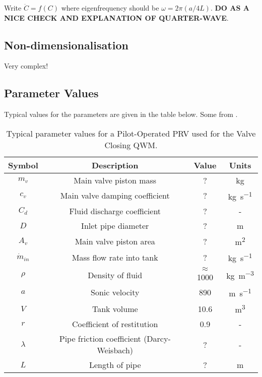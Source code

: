 Write $\ddot{C} = f(C)$ where eigenfrequency should be $\omega = 2\pi\left( a / 4L \right)$. \textbf{DO AS A NICE CHECK AND EXPLANATION OF QUARTER-WAVE}.

\subsection{Non-dimensionalisation}

Very complex!

\subsection{Parameter Values}

Typical values for the parameters are given in the table below. Some from \cite{Hos2016DynamicService}.

\begin{table}[ht]
    \centering
    \begin{tabular}{c|c|c|c}
        Symbol & Description & Value & Units \\ \hline \hline
        $m_v$ & Main valve piston mass & ? & \si{kg} \\ \hline %
        $c_v$ & Main valve damping coefficient & ? & \si{kg.s^{-1}} \\ \hline %
        $C_d$ & Fluid discharge coefficient & ? & - \\ \hline %
        $D$ & Inlet pipe diameter & ? & \si{m} \\ \hline %
        $A_v$ & Main valve piston area & ? & \si{m^2} \\ \hline
        $\dot{m}_{in}$ & Mass flow rate into tank & ? & \si{kg.s^{-1}} \\ \hline %
        $\rho$ & Density of fluid & $\approx$1000 & \si{kg.m^{-3}} \\ \hline %
        $a$ & Sonic velocity & 890 & \si{m.s^{-1}} \\ \hline %
        $V$ & Tank volume & 10.6 & \si{m^3} \\ \hline %
        $r$ & Coefficient of restitution & 0.9 & - \\ \hline %
        $\lambda$ & Pipe friction coefficient (Darcy-Weisbach) & ? & - \\ \hline %
        $L$ & Length of pipe & ? & \si{m} \\ %
    \end{tabular}
    \caption{Typical parameter values for a Pilot-Operated PRV used for the Valve Closing QWM.}
    \label{tab: ValveClosingQWMParameterValues}
\end{table}